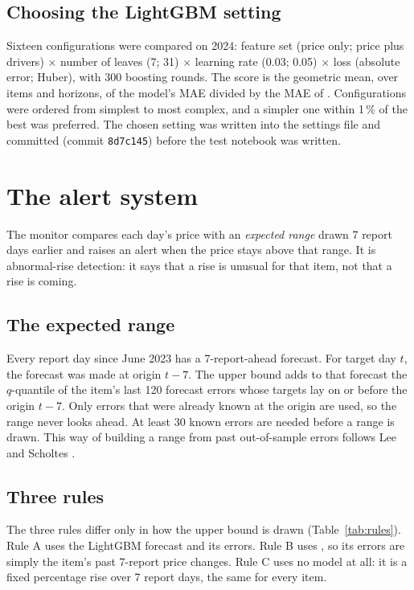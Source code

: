 \subsection{Choosing the LightGBM setting}
Sixteen configurations were compared on 2024: feature set (price only; price plus drivers) $\times$ number of leaves (7; 31) $\times$ learning rate (0.03; 0.05) $\times$ loss (absolute error; Huber), with 300 boosting rounds. The score is the geometric mean, over items and horizons, of the model's MAE divided by the MAE of \naive{}. Configurations were ordered from simplest to most complex, and a simpler one within 1\,\% of the best was preferred. The chosen setting was written into the settings file and committed (commit \texttt{8d7c145}) before the test notebook was written.

\section{The alert system}\label{sec:method-alerts}
The monitor compares each day's price with an \emph{expected range} drawn 7 report days earlier and raises an alert when the price stays above that range. It is abnormal-rise detection: it says that a rise is unusual for that item, not that a rise is coming.

\subsection{The expected range}
Every report day since June 2023 has a 7-report-ahead forecast. For target day $t$, the forecast was made at origin $t-7$. The upper bound adds to that forecast the $q$-quantile of the item's last 120 forecast errors whose targets lay on or before the origin $t-7$. Only errors that were already known at the origin are used, so the range never looks ahead. At least 30 known errors are needed before a range is drawn. This way of building a range from past out-of-sample errors follows Lee and Scholtes \cite{lee2014}.

\subsection{Three rules}
The three rules differ only in how the upper bound is drawn (Table~\ref{tab:rules}). Rule A uses the LightGBM forecast and its errors. Rule B uses \naive{}, so its errors are simply the item's past 7-report price changes. Rule C uses no model at all: it is a fixed percentage rise over 7 report days, the same for every item.

